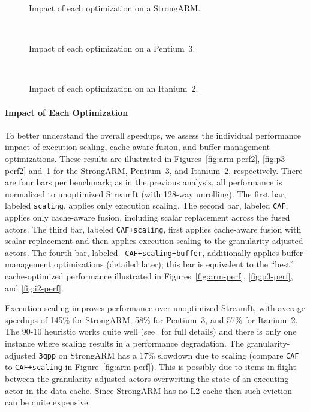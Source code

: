 \begin{figure}[t]
\nocaptionrule
\begin{minipage}{3.35in}
\centering
{}
\vspace{-14pt}
\caption{Impact of each optimization on a StrongARM.\protect\label{fig:arm-perf2}}
~ \\ \vspace{3pt}

\vspace{-14pt}
\caption{Impact of each optimization on a Pentium~3.\protect\label{fig:p3-perf2}}
~ \\ \vspace{3pt}

\vspace{-14pt}
\caption{Impact of each optimization on an Itanium~2.\protect\label{fig:i2-perf2}}
\end{minipage}
\end{figure}

\paragraph*{Impact of Each Optimization}
To better understand the overall speedups, we assess the individual
performance impact of execution scaling, cache aware fusion, and
buffer management optimizations.  These results are illustrated in
Figures~\ref{fig:arm-perf2}, \ref{fig:p3-perf2} and~\ref{fig:i2-perf2}
for the StrongARM, Pentium~3, and Itanium~2, respectively.  There are
four bars per benchmark; as in the previous analysis, all performance
is normalized to unoptimized StreamIt (with 128-way unrolling).  The
first bar, labeled {\tt scaling}, applies only execution scaling.  The
second bar, labeled {\tt CAF}, applies only cache-aware fusion,
including scalar replacement across the fused actors.  The third bar,
labeled {\tt CAF+scaling}, first applies cache-aware fusion with
scalar replacement and then applies execution-scaling to the
granularity-adjusted actors.  The fourth bar, labeled {\tt
CAF+scaling+buffer}, additionally applies buffer management
optimizations (detailed later); this bar is equivalent to the ``best''
cache-optimized performance illustrated in Figures~\ref{fig:arm-perf},
\ref{fig:p3-perf}, and \ref{fig:i2-perf}.

Execution scaling improves performance over unoptimized StreamIt, with
average speedups of 145\% for StrongARM, 58\% for Pentium~3, and 57\%
for Itanium~2.  The 90-10 heuristic works quite well
(see~\cite{janis-thesis} for full details) and there is only one
instance where scaling results in a performance degradation. The
granularity-adjusted \texttt{3gpp} on StrongARM has a 17\% slowdown
due to scaling (compare {\tt CAF} to {\tt CAF+scaling} in
Figure~\ref{fig:arm-perf}).  This is possibly due to items in flight
between the granularity-adjusted actors overwriting the state of an
executing actor in the data cache.  Since StrongARM has no L2 cache
then such eviction can be quite expensive.


